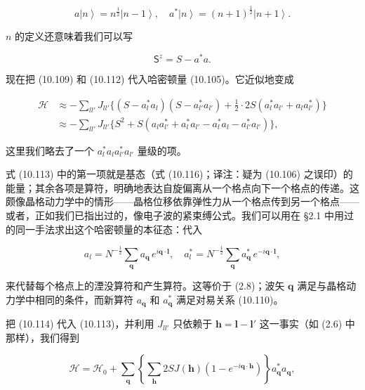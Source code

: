 \begin{equation*}
a\left|n\right\rangle = n^{\frac{1}{2}}\left|n-1\right\rangle, \quad a^{*}\left|n\right\rangle = (n+1)^{\frac{1}{2}}\left|n+1\right\rangle.
\tag{10.111}
\end{equation*}

$n$ 的定义还意味着我们可以写

\begin{equation*}
\mathsf{S}^z = S - a^{*}a.
\tag{10.112}
\end{equation*}

现在把 (10.109) 和 (10.112) 代入哈密顿量 (10.105)。它近似地变成

\begin{align*}
\mathcal{H} &\approx -\sum_{ll'} J_{ll'}\{(S-a_l^{*}a_l)(S-a_{l'}^{*}a_{l'})+\tfrac{1}{2}\cdot 2S(a_l^{*}a_{l'}+a_l a_{l'}^{*})\}\\
&\approx -\sum_{ll'} J_{ll'}\{S^2 + S(a_l a_{l'}^{*}+a_l^{*}a_{l'}-a_l^{*}a_l-a_{l'}^{*}a_{l'})\},
\tag{10.113}
\end{align*}

这里我们略去了一个 $a_l^{*}a_l a_{l'}^{*}a_{l'}$ 量级的项。

式 (10.113) 中的第一项就是基态（式 (10.116)；译注：疑为 (10.106) 之误印）的能量；其余各项是算符，明确地表达自旋偏离从一个格点向下一个格点的传递。这颇像晶格动力学中的情形——晶格位移依靠弹性力从一个格点传到另一个格点——或者，正如我们已指出过的，像电子波的紧束缚公式。我们可以用在 §2.1 中用过的同一手法求出这个哈密顿量的本征态：代入

\begin{equation*}
a_l = N^{-\frac{1}{2}}\sum_{\mathbf{q}} a_{\mathbf{q}}\,e^{i\mathbf{q}\cdot\mathbf{l}}, \quad a_l^{*} = N^{-\frac{1}{2}}\sum_{\mathbf{q}} a_{\mathbf{q}}^{*}\,e^{-i\mathbf{q}\cdot\mathbf{l}},
\tag{10.114}
\end{equation*}

来代替每个格点上的湮没算符和产生算符。这等价于 (2.8)；波矢 $\mathbf{q}$ 满足与晶格动力学中相同的条件，而新算符 $a_{\mathbf{q}}$ 和 $a_{\mathbf{q}}^{*}$ 满足对易关系 (10.110)。

把 (10.114) 代入 (10.113)，并利用 $J_{ll'}$ 只依赖于 $\mathbf{h} = \mathbf{l}-\mathbf{l}'$ 这一事实（如 (2.6) 中那样），我们得到

\begin{equation*}
\mathcal{H} = \mathcal{H}_0 + \sum_{\mathbf{q}}\left\{\sum_{\mathbf{h}} 2SJ(\mathbf{h})\left(1-e^{-i\mathbf{q}\cdot\mathbf{h}}\right)\right\}a_{\mathbf{q}}^{*}a_{\mathbf{q}},
\tag{10.115}
\end{equation*}

